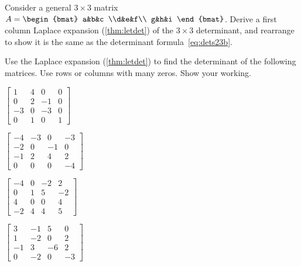 \begin{exercise}  
Consider a general \(3\times3\) matrix \(A=\begin{bmat} a&b&c \\d&e&f\\ g&h&i \end{bmat}\).
Derive a first column Laplace expansion (\cref{thm:letdet}) of the \(3\times3\) determinant, and rearrange to show it is the same as the determinant formula~\eqref{eq:dets23b}.
\end{exercise}





\begin{exercise}  
Use the Laplace expansion (\cref{thm:letdet}) to find the determinant of the following matrices.  
Use rows or columns with many zeros.
Show your working.
\begin{Parts}
\item \(\begin{bmatrix} 1 & 4 & 0 & 0
\\0 & 2 & -1 & 0
\\-3 & 0 & -3 & 0
\\0 & 1 & 0 & 1 \end{bmatrix}\)

\item \(\begin{bmatrix} -4 & -3 & 0 & -3
\\-2 & 0 & -1 & 0
\\-1 & 2 & 4 & 2
\\0 & 0 & 0 & -4 \end{bmatrix}\)

\begin{reduce}
\item \(\begin{bmatrix} -4 & 0 & -2 & 2
\\0 & 1 & 5 & -2
\\4 & 0 & 0 & 4
\\-2 & 4 & 4 & 5 \end{bmatrix}\)

\item \(\begin{bmatrix} 3 & -1 & 5 & 0
\\1 & -2 & 0 & 2
\\-1 & 3 & -6 & 2
\\0 & -2 & 0 & -3 \end{bmatrix}\)


\end{reduce}
\end{Parts}
\end{exercise}
